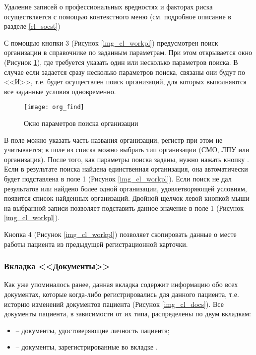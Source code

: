 Удаление записей о профессиональных вредностях и факторах риска осуществляется с помощью контекстного меню (см. подробное описание в разделе \ref{cl_socst})

С помощью кнопки 3 (Рисунок \ref{img_cl_workpl}) предусмотрен поиск организации в справочнике по заданным параметрам. При этом открывается окно (Рисунок \ref{img_cl_org_find}), где требуется указать один или несколько параметров поиска. В случае если задается сразу несколько параметров поиска, связаны они будут по <<И>>, т.е. будет осуществлен поиск организаций, для которых выполняются все заданные условия одновременно.

\begin{figure}[ht]\centering
 \texttt{[image: org\_find]}
 \caption{Окно параметров поиска организации}
 \label{img_cl_org_find}
\end{figure} 

В поле  можно указать часть названия организации, регистр при этом не учитывается; в поле  из списка можно выбрать тип организации (СМО, ЛПУ или организация). После того, как параметры поиска заданы, нужно нажать кнопку  . Если в результате поиска найдена единственная организация, она автоматически будет подставлена в поле 1 (Рисунок \ref{img_cl_workpl}). Если поиск не дал результатов или найдено более одной организации, удовлетворяющей условиям, появится список найденных организаций. Двойной щелчок левой кнопкой мыши на выбранной записи позволяет подставить данное значение в поле 1 (Рисунок \ref{img_cl_workpl}).

\begin{prim}
 Кнопка 4 (Рисунок \ref{img_cl_workpl}) позволяет скопировать данные о месте работы пациента из предыдущей регистрационной карточки.
\end{prim}

\subsubsection{Вкладка <<Документы>>} \label{cl_docs}

Как уже упоминалось ранее, данная вкладка содержит информацию обо всех документах, которые когда-либо регистрировались для данного пациента, т.е. историю изменений документов пациента (Рисунок \ref{img_cl_docs}). Все документы пациента, в зависимости от их типа, распределены по двум вкладкам:
\begin{itemize}
 \item {} – документы, удостоверяющие личность пациента;
 \item	{} – документы, зарегистрированные во вкладке .
\end{itemize}

